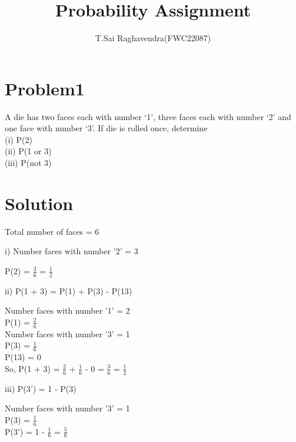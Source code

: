 \documentclass[journal,12pt,twocolumn]{IEEEtran}
\title{\mytitle}
\title{
Probability Assignment
}
\author{T.Sai Raghavendra(FWC22087)}
\begin{document}
\maketitle
\tableofcontents
\bigskip


\section{\textbf{Problem1}}
A die has two faces each with number ‘1’, three faces each with number ‘2’ and
one face with number ‘3’. If die is rolled once, determine\\
(i) P(2) \\(ii) P(1 or 3) \\(iii) P(not 3)\\
\section{\textbf{Solution}}
Total number of faces = 6

i) Number faces with number '2' = 3
\begin{center}
	P(2) = $\frac{3}{6}$ = $\frac{1}{2}$
\end{center}
	
ii) P(1 + 3) = P(1) + P(3) - P(13)
\begin{center}
	Number faces with number '1' = 2\\
	P(1) = $\frac{2}{6}$\\
	Number faces with number '3' = 1\\
	P(3) = $\frac{1}{6}$\\
	P(13) = 0\\
	So, P(1 + 3) = $\frac{2}{6}$ + $\frac{1}{6}$ - 0 = $\frac{3}{6}$ = $\frac{1}{2}$
\end{center}
	
iii) P(3') = 1 - P(3)
\begin{center}
	Number faces with number '3' = 1\\
	P(3) = $\frac{1}{6}$\\ 
	P(3') = 1 - $\frac{1}{6}$ = $\frac{5}{6}$
\end{center}
\end{document}

